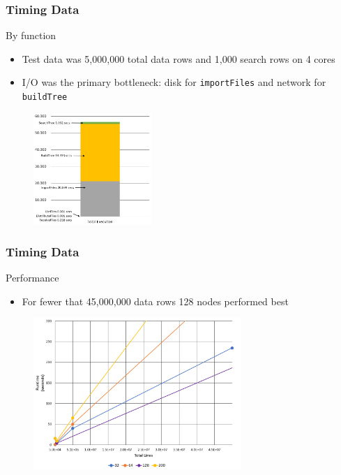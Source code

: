 \documentclass[usernames,dvipsnames]{beamer}
\begin{document}
\begin{frame}[fragile]	
	\frametitle{Timing Data}
	
        	\begin{block}{By function}
        		\begin{itemize}
        			\item Test data was 5,000,000 total data rows and 1,000 search rows on 4 cores
        			\item I/O was the primary bottleneck: disk for \texttt{importFiles} and network for \texttt{buildTree}
        		\end{itemize}
        	\end{block}
        	\begin{figure}
            \centering
	        \includegraphics[width=0.40\textwidth]{images/Runtime3.png}
	        \end{figure}
\end{frame}



\begin{frame}[fragile]	
	\frametitle{Timing Data}
	
        	\begin{block}{Performance}
        		\begin{itemize}
        			\item For fewer that 45,000,000 data rows 128 nodes performed best
        		\end{itemize}
        	\end{block}
        	\begin{figure}
            \centering
	        \includegraphics[width=0.7\textwidth]{images/Runtime1.png}
	        \end{figure}
\end{frame}
\end{document}
